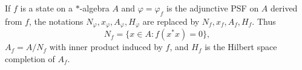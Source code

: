 If $f$ is a state on a $*$-algebra $A$ and $\varphi = \varphi_f$ is the adjunctive PSF on $A$ derived from $f$, the notations $N_\varphi, x_\varphi, A_\varphi, H_\varphi$ are replaced by $N_f, x_f, A_f, H_f$. Thus
$$N_f = \{x \in A : f(x^*x) = 0\},$$
$A_f = A/N_f$ with inner product induced by $f$, and $H_f$ is the Hilbert space completion of $A_f$.
